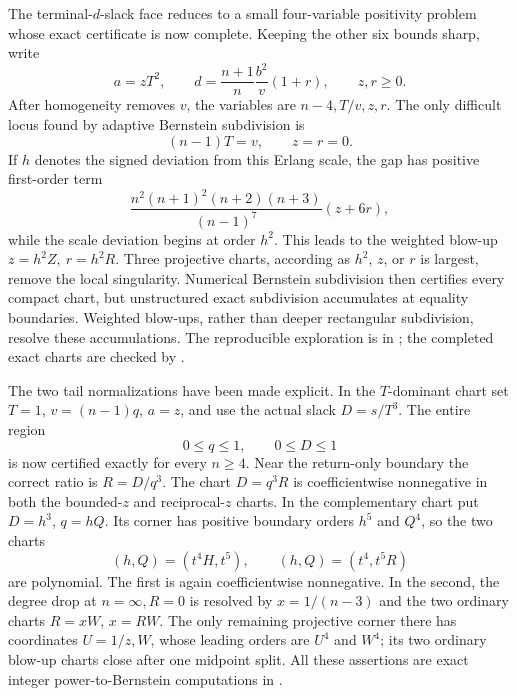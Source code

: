 \documentclass[11pt]{article}
\theoremstyle{remark}
\begin{document}
The terminal-\(d\)-slack face reduces to a small four-variable positivity
problem whose exact certificate is now complete.  Keeping the other six
bounds sharp, write
\[
 a=zT^2,\qquad
 d=\frac{n+1}{n}\frac{b^2}{v}(1+r),\qquad z,r\geq0.
\]
After homogeneity removes \(v\), the variables are \(n-4,T/v,z,r\).
The only difficult locus found by adaptive Bernstein subdivision is
\[
 (n-1)T=v,\qquad z=r=0.
\]
If \(h\) denotes the signed deviation from this Erlang scale, the gap has
positive first-order term
\[
 \frac{n^2(n+1)^2(n+2)(n+3)}{(n-1)^7}(z+6r),
\]
while the scale deviation begins at order \(h^2\).  This leads to the weighted
blow-up \(z=h^2Z,\ r=h^2R\).  Three projective charts, according as \(h^2\),
\(z\), or \(r\) is largest, remove the local singularity.  Numerical
Bernstein subdivision then certifies every compact chart, but unstructured
exact subdivision accumulates at equality boundaries.  Weighted blow-ups,
rather than deeper rectangular subdivision, resolve these accumulations.
The reproducible exploration is in
; the completed exact charts are
checked by .

The two tail normalizations have been made explicit.  In the \(T\)-dominant
chart set \(T=1\), \(v=(n-1)q\), \(a=z\), and use the actual slack
\(D=s/T^3\).  The entire region
\[
        0\leq q\leq1,\qquad 0\leq D\leq1
\]
is now certified exactly for every \(n\geq4\).  Near the return-only boundary
the correct ratio is \(R=D/q^3\).  The chart \(D=q^3R\) is coefficientwise
nonnegative in both the bounded-\(z\) and reciprocal-\(z\) charts.  In the
complementary chart put \(D=h^3\), \(q=hQ\).  Its corner has positive boundary
orders \(h^5\) and \(Q^4\), so the two charts
\[
 (h,Q)=(t^4H,t^5),\qquad (h,Q)=(t^4,t^5R)
\]
are polynomial.  The first is again coefficientwise nonnegative.  In the
second, the degree drop at \(n=\infty,R=0\) is resolved by
\(x=1/(n-3)\) and the two ordinary charts \(R=xW\), \(x=RW\).  The only
remaining projective corner there has coordinates \(U=1/z,W\), whose leading
orders are \(U^4\) and \(W^4\); its two ordinary blow-up charts close after
one midpoint split.  All these assertions are exact integer
power-to-Bernstein computations in
.
\end{document}
